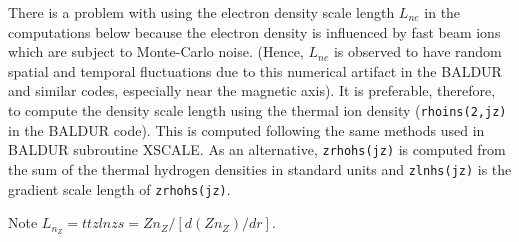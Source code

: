 There is a problem with using the electron density scale length $L_{ne}$
in the computations below because the electron density is influenced by
fast beam ions which are subject to Monte-Carlo noise.
(Hence, $L_{ne}$ is observed to have random spatial and temporal fluctuations
due to this numerical artifact in the BALDUR and similar codes, 
especially near the magnetic axis).
It is preferable, therefore, to compute the density scale length using
the thermal ion density ({\tt rhoins(2,jz)} in the BALDUR code).
This is computed following the same methods used in BALDUR subroutine
XSCALE.
As an alternative, {\tt zrhohs(jz)} is computed from the sum of the
thermal hydrogen densities in standard units 
and {\tt zlnhs(jz)} is the gradient scale length of {\tt zrhohs(jz)}.

Note $ L_{n_Z} = {tt zlnzs} = Z n_Z / [ d ( Z n_Z ) / d r ] $.

